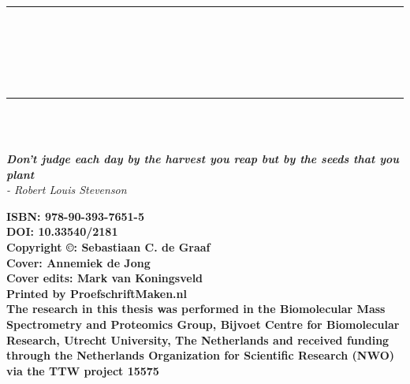 \cleardoublepage
\pagestyle{empty} %
\frontmatter %
\begin{titlepage}
    \begin{center}
        \rule{\textwidth}{1.5pt}\\[0cm]
        {\huge \bfseries \thesistitle \par \ }\\[-0.5cm]
        \rule{\textwidth}{1.5pt}\\[2.5cm]
        {\large \bfseries\name}\\
        [2cm]
        \begin{small}
            \emph{\textbf{Don't judge each day by the harvest you reap but by the seeds that you plant} \\
                - Robert Louis Stevenson}
        \end{small}
    \end{center}
    \clearpage
    \begin{flushleft}
        \vspace*{\fill}

        {\small \textbf{ISBN: 978-90-393-7651-5}\\
        \textbf{DOI: 10.33540/2181}\\
        [0.5cm]
        \textbf{Copyright ©: Sebastiaan C. de Graaf}\\
        \textbf{Cover: Annemiek de Jong}\\
        \textbf{Cover edits: Mark van Koningsveld}\\
        \textbf{Printed by ProefschriftMaken.nl}\\
        [0.5cm]
        \textbf{The research in this thesis was performed in the Biomolecular Mass
            Spectrometry and Proteomics Group, Bijvoet Centre for Biomolecular Research, Utrecht University, The Netherlands and received funding through the Netherlands Organization for Scientific Research (NWO) via the TTW project 15575}}


\end{flushleft}
\end{titlepage}
